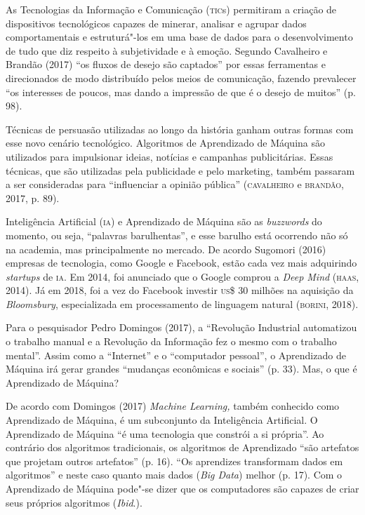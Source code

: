\noindent{}As Tecnologias da Informação e Comunicação (\textsc{tic}s) permitiram a criação
de dispositivos tecnológicos capazes de minerar, analisar e agrupar
dados comportamentais e estruturá"-los em uma base de dados para o
desenvolvimento de tudo que diz respeito à subjetividade e à emoção.
Segundo Cavalheiro e Brandão (2017) ``os fluxos de desejo são captados''
por essas ferramentas e direcionados de modo distribuído pelos meios de
comunicação, fazendo prevalecer ``os interesses de poucos, mas dando a
impressão de que é o desejo de muitos'' (p. 98).

Técnicas de persuasão utilizadas ao longo da história ganham outras
formas com esse novo cenário tecnológico. Algoritmos de Aprendizado de
Máquina são utilizados para impulsionar ideias, notícias e campanhas
publicitárias. Essas técnicas, que são utilizadas pela publicidade e
pelo marketing, também passaram a ser consideradas para ``influenciar a
opinião pública'' (\textsc{cavalheiro} e \textsc{brandão}, 2017, p. 89).

Inteligência Artificial (\textsc{ia}) e Aprendizado de Máquina são as
\emph{buzzwords} do momento, ou seja, ``palavras barulhentas'', e esse
barulho está ocorrendo não só na academia, mas principalmente no
mercado. De acordo Sugomori (2016) empresas de tecnologia, como Google e
Facebook, estão cada vez mais adquirindo \emph{startups} de \textsc{ia}. Em 2014,
foi anunciado que o Google comprou a \emph{Deep Mind} (\textsc{haas}, 2014). Já
em 2018, foi a vez do Facebook investir \textsc{us}\$ 30 milhões na aquisição da
\emph{Bloomsbury}, especializada em processamento de linguagem natural
(\textsc{borini}, 2018).

Para o pesquisador Pedro Domingos (2017), a ``Revolução Industrial
automatizou o trabalho manual e a Revolução da Informação fez o mesmo
com o trabalho mental''. Assim como a ``Internet'' e o ``computador
pessoal'', o Aprendizado de Máquina irá gerar grandes ``mudanças
econômicas e sociais'' (p. 33). Mas, o que é Aprendizado de Máquina?

De acordo com Domingos (2017) \emph{Machine Learning,} também conhecido
como Aprendizado de Máquina, é um subconjunto da Inteligência
Artificial. O Aprendizado de Máquina ``é uma tecnologia que constrói a
si própria''. Ao contrário dos algoritmos tradicionais, os algoritmos de
Aprendizado ``são artefatos que projetam outros artefatos'' (p. 16).
``Os aprendizes transformam dados em algoritmos'' e neste caso quanto
mais dados (\emph{Big Data}) melhor (p. 17). Com o Aprendizado de
Máquina pode"-se dizer que os computadores são capazes de criar seus
próprios algoritmos (\emph{Ibid}.).

